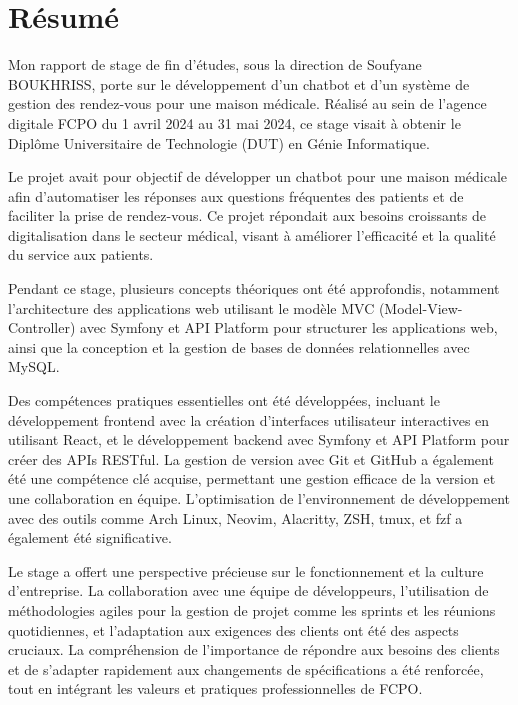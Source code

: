 \chapter*{Résumé}

\hspace{16pt}Mon rapport de stage de fin d’études, sous la direction de Soufyane BOUKHRISS, porte sur le développement d’un chatbot et d’un système de gestion des rendez-vous pour une maison médicale. Réalisé au sein de l'agence digitale FCPO du 1 avril 2024 au 31 mai 2024, ce stage visait à obtenir le Diplôme Universitaire de Technologie (DUT) en Génie Informatique.

Le projet avait pour objectif de développer un chatbot pour une maison médicale afin d'automatiser les réponses aux questions fréquentes des patients et de faciliter la prise de rendez-vous. Ce projet répondait aux besoins croissants de digitalisation dans le secteur médical, visant à améliorer l'efficacité et la qualité du service aux patients.

Pendant ce stage, plusieurs concepts théoriques ont été approfondis, notamment l'architecture des applications web utilisant le modèle MVC (Model-View-Controller) avec Symfony et API Platform pour structurer les applications web, ainsi que la conception et la gestion de bases de données relationnelles avec MySQL.

Des compétences pratiques essentielles ont été développées, incluant le développement frontend avec la création d'interfaces utilisateur interactives en utilisant React, et le développement backend avec Symfony et API Platform pour créer des APIs RESTful. La gestion de version avec Git et GitHub a également été une compétence clé acquise, permettant une gestion efficace de la version et une collaboration en équipe. L’optimisation de l’environnement de développement avec des outils comme Arch Linux, Neovim, Alacritty, ZSH, tmux, et fzf a également été significative.

Le stage a offert une perspective précieuse sur le fonctionnement et la culture d’entreprise. La collaboration avec une équipe de développeurs, l’utilisation de méthodologies agiles pour la gestion de projet comme les sprints et les réunions quotidiennes, et l'adaptation aux exigences des clients ont été des aspects cruciaux. La compréhension de l’importance de répondre aux besoins des clients et de s’adapter rapidement aux changements de spécifications a été renforcée, tout en intégrant les valeurs et pratiques professionnelles de FCPO.

